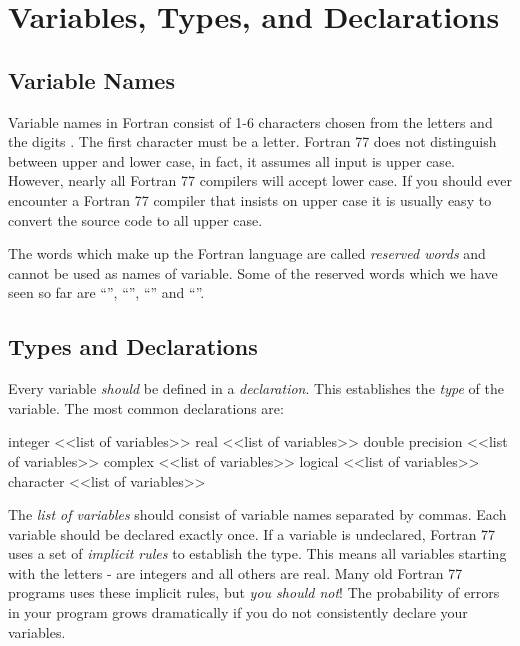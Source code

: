 \section{Variables, Types, and Declarations}

\subsection*{Variable Names}

Variable names in Fortran consist of 1-6 characters chosen from the
letters  and the digits . The first
character must be a letter. Fortran 77 does not distinguish between
upper and lower case, in fact, it assumes all input is upper case.
However, nearly all Fortran 77 compilers will accept lower case. If you
should ever encounter a Fortran 77 compiler that insists on upper case
it is usually easy to convert the source code to all upper case.

The words which make up the Fortran language are called \textit{reserved
words} and cannot be used as names of variable. Some of the reserved
words which we have seen so far are ``'',
``'', ``'' and
``''.


\subsection*{Types and Declarations}

Every variable \textit{should} be defined in a \textit{declaration}.
This establishes the \textit{type} of the variable. The most common
declarations are:

\begin{fortran77}
      integer           <<list of variables>>
      real              <<list of variables>>
      double precision  <<list of variables>>
      complex           <<list of variables>>
      logical           <<list of variables>>
      character         <<list of variables>>
\end{fortran77}

The \textit{list of variables} should consist of variable names
separated by commas. Each variable should be declared exactly once. If a
variable is undeclared, Fortran 77 uses a set of \textit{implicit rules}
to establish the type. This means all variables starting with the
letters - are integers and all
others are real. Many old Fortran 77 programs uses these implicit rules,
but \textit{you should not}! The probability of errors in your program
grows dramatically if you do not consistently declare your variables.


